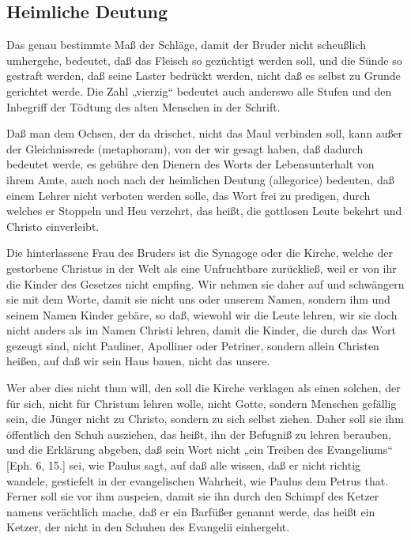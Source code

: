 \subsection{Heimliche Deutung}

Das genau bestimmte Maß der Schläge, damit der Bruder nicht scheußlich umhergehe, bedeutet, daß das Fleisch so gezüchtigt werden soll, und die Sünde so gestraft werden, daß seine Laster bedrückt werden, nicht daß es selbst zu Grunde gerichtet werde. Die Zahl „vierzig“ bedeutet auch anderswo alle Stufen und den Inbegriff der Tödtung des alten Menschen in der Schrift.

Daß man dem Ochsen, der da drischet, nicht das Maul verbinden soll, kann außer der Gleichnissrede (metaphoram), von der wir gesagt haben, daß dadurch bedeutet werde, es gebühre den Dienern des Worts der Lebensunterhalt von ihrem Amte, auch noch nach der heimlichen Deutung (allegorice) bedeuten, daß einem Lehrer nicht verboten werden solle, das Wort frei zu predigen, durch welches er Stoppeln und Heu verzehrt, das heißt, die gottlosen Leute bekehrt und Christo einverleibt.

Die hinterlassene Frau des Bruders ist die Synagoge oder die Kirche, welche der gestorbene
Christus in der Welt als eine Unfruchtbare zurückließ, weil er von ihr die Kinder des Gesetzes nicht empfing. Wir nehmen sie daher auf und schwängern sie mit dem Worte, damit sie nicht uns oder unserem Namen, sondern ihm und seinem Namen Kinder gebäre, so daß, wiewohl wir die Leute lehren, wir sie doch nicht anders als im Namen Christi lehren, damit die Kinder, die durch das Wort gezeugt sind, nicht Pauliner, Apolliner oder Petriner, sondern allein Christen heißen, auf daß wir sein Haus bauen, nicht das unsere.

Wer aber dies nicht thun will, den soll die Kirche verklagen als einen solchen, der für sich, nicht für Christum lehren wolle, nicht Gotte, sondern Menschen gefällig sein, die Jünger nicht zu Christo, sondern zu sich selbst ziehen. Daher soll sie ihm öffentlich den Schuh ausziehen, das heißt, ihn der Befugniß zu lehren berauben, und die Erklärung abgeben, daß sein Wort nicht „ein Treiben des Evangeliums“ [Eph. 6, 15.] sei, wie Paulus sagt, auf daß alle wissen, daß er nicht richtig wandele, gestiefelt in der evangelischen Wahrheit, wie Paulus dem Petrus that. Ferner soll sie vor ihm auspeien, damit sie ihn durch den Schimpf des Ketzer namens verächtlich mache, daß er ein Barfüßer genannt werde, das heißt ein Ketzer, der nicht in den Schuhen des Evangelii einhergeht.

